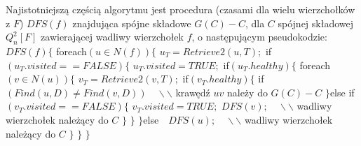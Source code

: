 \documentclass{pracamgr}
\begin{document}
     Najistotniejszą częścią algorytmu jest procedura (czasami dla wielu wierzchołków z $F$) $DFS(f)$ znajdująca spójne składowe $G(C)-C$,
     dla $C$ spójnej składowej $Q_n^2[F]$ zawierającej wadliwy wierzchołek $f$, o następującym pseudokodzie:\newline\newline    
     \hspace*{0pt}$DFS(f)\{$\newline
     \hspace*{16pt}	foreach$(u\in N(f))\{$\newline
     \hspace*{32pt}		$u_T=Retrieve2(u,T);$\newline
     \hspace*{32pt}		if$(u_T.visited==FALSE)\{$\newline
     \hspace*{48pt}			$u_T.visited=TRUE;$\newline
     \hspace*{48pt}			if$(u_T.healthy)\{$\newline
     \hspace*{64pt}				foreach$(v\in N(u))\{$\newline
     \hspace*{80pt}					$v_T=Retrieve2(v,T);$\newline
     \hspace*{80pt}					if$(v_T.healthy)\{$\newline
     \hspace*{96pt}						if$(Find(u,D)\neq Find(v,D))\quad\backslash\backslash$ krawędź $uv$ należy do $G(C)-C$\newline
     \hspace*{80pt}					$\}$else if$(v_T.visited==FALSE)\{$\newline
     \hspace*{96pt}						$v_T.visited=TRUE;$\newline
     \hspace*{96pt}						$DFS(v);\quad\backslash\backslash$ wadliwy wierzchołek należący do $C$\newline
     \hspace*{80pt}					$\}$\newline
     \hspace*{64pt}				$\}$\newline
     \hspace*{48pt}			$\}$else$\quad DFS(u);\quad\backslash\backslash$ wadliwy wierzchołek należący do $C$\newline
     \hspace*{32pt}		$\}$\newline
     \hspace*{16pt}	$\}$\newline
     \hspace*{0pt}$\}$\newline
     
\end{document}
